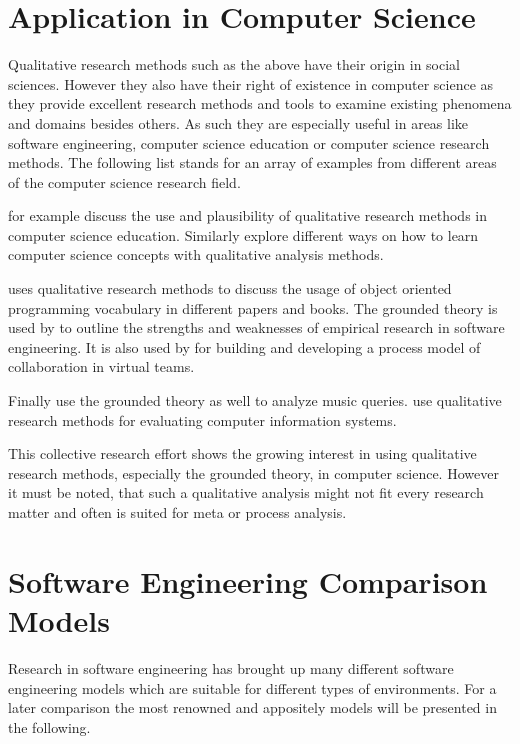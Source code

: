 \section{Application in Computer Science} %

Qualitative research methods such as the above have their origin in social
sciences. However they also have their right of existence in computer science
as they provide excellent research methods and tools to examine existing
phenomena and domains besides others. As such they are especially useful in
areas like software engineering, computer science education or computer science
research methods. The following list stands for an array of examples from
different areas of the computer science research field.

\textcite{Hazzan2006} for example discuss the use and plausibility of
qualitative research methods in computer science education. Similarly
\textcite{Meerbaum-Salant2010} explore different ways on how to learn computer
science concepts with qualitative analysis methods.

\textcite{Armstrong2006} uses qualitative research methods to discuss the usage
of object oriented programming vocabulary in different papers and books. The
grounded theory is used by \textcite{Perry2000} to outline the strengths and
weaknesses of empirical research in software engineering. It is also used by
\textcite{Sarker2001} for building and developing a process model of
collaboration in virtual teams.

Finally \textcite{Bainbridge2003} use the grounded theory as well to analyze
music queries. \textcite{Kaplan1994} use qualitative research methods for
evaluating computer information systems.

This collective research effort shows the growing interest in using qualitative
research methods, especially the grounded theory, in computer science. However
it must be noted, that such a qualitative analysis might not fit every research
matter and often is suited for meta or process analysis.


\section{Software Engineering Comparison Models} %

Research in software engineering has brought up many different software
engineering models which are suitable for different types of environments. For
a later comparison the most renowned and appositely models will be presented in
the following.

